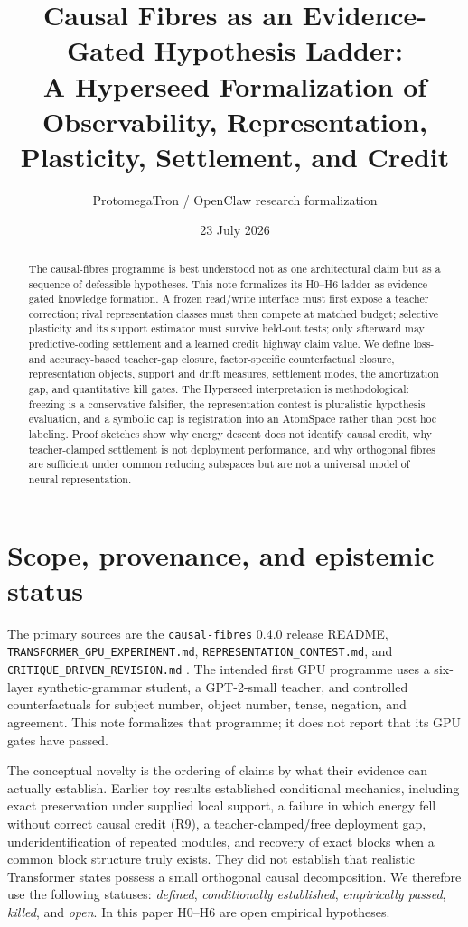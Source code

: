 \documentclass[11pt]{article}
\title{Causal Fibres as an Evidence-Gated Hypothesis Ladder:\\
A Hyperseed Formalization of Observability, Representation,\\
Plasticity, Settlement, and Credit}
\author{ProtomegaTron / OpenClaw research formalization}
\date{23 July 2026}
\begin{document}
\maketitle

\begin{abstract}
The causal-fibres programme is best understood not as one architectural claim
but as a sequence of defeasible hypotheses.  This note formalizes its H0--H6
ladder as evidence-gated knowledge formation.  A frozen read/write interface
must first expose a teacher correction; rival representation classes must then
compete at matched budget; selective plasticity and its support estimator must
survive held-out tests; only afterward may predictive-coding settlement and a
learned credit highway claim value.  We define loss- and accuracy-based
teacher-gap closure, factor-specific counterfactual closure, representation
objects, support and drift measures, settlement modes, the amortization gap,
and quantitative kill gates.  The Hyperseed interpretation is methodological:
freezing is a conservative falsifier, the representation contest is pluralistic
hypothesis evaluation, and a symbolic cap is registration into an AtomSpace
rather than post hoc labeling.  Proof sketches show why energy descent does not
identify causal credit, why teacher-clamped settlement is not deployment
performance, and why orthogonal fibres are sufficient under common reducing
subspaces but are not a universal model of neural representation.
\end{abstract}

\setcounter{tocdepth}{1}
\tableofcontents
\newpage

\section{Scope, provenance, and epistemic status}

The primary sources are the \texttt{causal-fibres} 0.4.0 release README,
\texttt{TRANSFORMER\_GPU\_EXPERIMENT.md},
\texttt{REPRESENTATION\_CONTEST.md}, and
\texttt{CRITIQUE\_DRIVEN\_REVISION.md} \cite{cfrelease}.  The intended first
GPU programme uses a six-layer synthetic-grammar student, a GPT-2-small
teacher, and controlled counterfactuals for subject number, object number,
tense, negation, and agreement.  This note formalizes that programme; it does
not report that its GPU gates have passed.

The conceptual novelty is the ordering of claims by what their evidence can
actually establish.  Earlier toy results established conditional mechanics,
including exact preservation under supplied local support, a failure in which
energy fell without correct causal credit (R9), a teacher-clamped/free
deployment gap, underidentification of repeated modules, and recovery of exact
blocks when a common block structure truly exists.  They did not establish
that realistic Transformer states possess a small orthogonal causal
decomposition.  We therefore use the following statuses:
\emph{defined}, \emph{conditionally established}, \emph{empirically passed},
\emph{killed}, and \emph{open}.  In this paper H0--H6 are open empirical
hypotheses.
\end{document}
